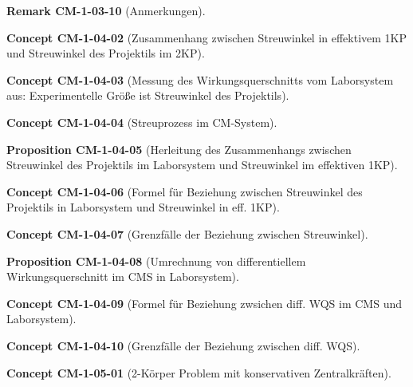 \documentclass[10pt, letterpaper]{article}
\newcommand{\CustomHeading}[3]{%
  \par\medskip\noindent%
  \textbf{#1 #2} \textnormal{(#3)}.\enskip%
}
\newenvironment{PROP}[2]{\CustomHeading{Proposition}{#1}{#2}}{}
\newenvironment{REM}[2]{\CustomHeading{Remark}{#1}{#2}}{}
\newenvironment{CONC}[2]{\CustomHeading{Concept}{#1}{#2}}{}
\begin{document}
\begin{REM}{CM-1-03-10}{Anmerkungen}
\end{REM}

\begin{CONC}{CM-1-04-02}{Zusammenhang zwischen Streuwinkel in effektivem 1KP und Streuwinkel des Projektils im 2KP}
\end{CONC}

\begin{CONC}{CM-1-04-03}{Messung des Wirkungsquerschnitts vom Laborsystem aus: Experimentelle Größe ist Streuwinkel des Projektils}
\end{CONC}

\begin{CONC}{CM-1-04-04}{Streuprozess im CM-System}
\end{CONC}

\begin{PROP}{CM-1-04-05}{Herleitung des Zusammenhangs zwischen Streuwinkel des Projektils im Laborsystem und Streuwinkel im effektiven 1KP}
\end{PROP}

\begin{CONC}{CM-1-04-06}{Formel für Beziehung zwischen Streuwinkel des Projektils in Laborsystem und Streuwinkel in eff. 1KP}
\end{CONC}

\begin{CONC}{CM-1-04-07}{Grenzfälle der Beziehung zwischen Streuwinkel}
\end{CONC}

\begin{PROP}{CM-1-04-08}{Umrechnung von differentiellem Wirkungsquerschnitt im CMS in Laborsystem}
\end{PROP}

\begin{CONC}{CM-1-04-09}{Formel für Beziehung zwsichen diff. WQS im CMS und Laborsystem}
\end{CONC}

\begin{CONC}{CM-1-04-10}{Grenzfälle der Beziehung zwischen diff. WQS}
\end{CONC}

\begin{CONC}{CM-1-05-01}{2-Körper Problem mit konservativen Zentralkräften}
\end{CONC}
\end{document}

